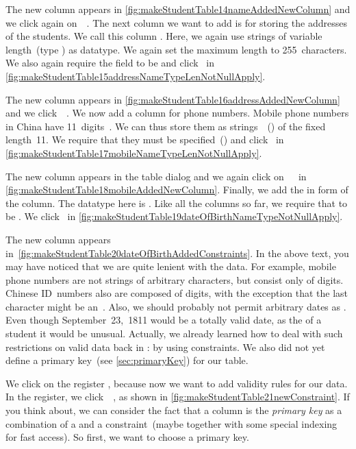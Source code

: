 The new column appears in \cref{fig:makeStudentTable14nameAddedNewColumn} and we click again on~~\pgmodelerAddItem.
The next column we want to add is for storing the addresses of the students.
We call this column .
Here, we again use strings of variable length~(type ) as datatype.
We again set the maximum length to 255~characters.
We also again require the field to be  and click~ in \cref{fig:makeStudentTable15addressNameTypeLenNotNullApply}.

The new column appears in \cref{fig:makeStudentTable16addressAddedNewColumn} and we click~~\pgmodelerAddItem.
We now add a column for  phone numbers.
Mobile phone numbers in China have 11~digits~\cite{BD2006BDBK:MPNANSBTTMDFMP}.
We can thus store them as strings~~() of the fixed length~11.
We require that they must be specified~() and click~ in \cref{fig:makeStudentTable17mobileNameTypeLenNotNullApply}.

The new column appears in the table dialog and we again click on~~\pgmodelerAddItem\ in \cref{fig:makeStudentTable18mobileAddedNewColumn}.
Finally, we add the  in form of the  column.
The datatype here is .
Like all the columns so far, we require that  to be .
We click~ in \cref{fig:makeStudentTable19dateOfBirthNameTypeNotNullApply}.

The new column appears in~\cref{fig:makeStudentTable20dateOfBirthAddedConstraints}.
In the above text, you may have noticed that we are quite lenient with the data.
For example, mobile phone numbers are not strings of arbitrary characters, but consist only of digits.
Chinese ID~numbers also are composed of digits, with the exception that the last character might be an~.
Also, we should probably not permit arbitrary dates as .
Even though September~23,~1811 would be a totally valid date, as the  of a student it would be unusual.
Actually, we already learned how to deal with such restrictions on valid data back in :
by using constraints.
We also did not yet define a primary key~(see \cref{sec:primaryKey}) for our table.

We click on the register , because now we want to add validity rules for our data.
In the  register, we click~~\pgmodelerAddItem, as shown in \cref{fig:makeStudentTable21newConstraint}.
If you think about, we can consider the fact that a column is the \emph{primary key} as a combination of a  and a  constraint~(maybe together with some special indexing for fast access).
So first, we want to choose a primary key.

